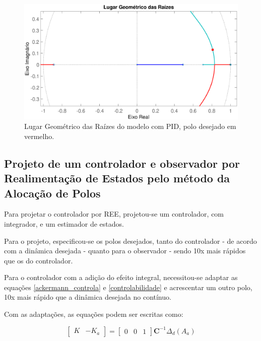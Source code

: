 \documentclass[conference,harvard,brazil,english]{sbatex}
\begin{document}
            \begin{figure}[!htb] 
                \centering \includegraphics[width=\columnwidth]{imagens/lgrPID.eps}{
                    \small
                    \centering
                    \caption{Lugar Geométrico das Raízes do modelo com PID, polo desejado em vermelho.}
                    \label{LGRPID}}    
            \end{figure}
            
        \subsection{Projeto de um controlador e observador por Realimentação de Estados pelo método da Alocação de Polos}
        
            Para projetar o controlador por REE, projetou-se um controlador, com integrador, e um estimador de estados.
                
            Para o projeto, especificou-se os polos desejados, tanto do controlador - de acordo com a dinâmica desejada - quanto para o observador - sendo 10x mais rápidos que os do controlador.
            
            Para o controlador com a adição do efeito integral, necessitou-se adaptar as equações \ref{ackermann_controla} e \ref{controlabilidade} e acrescentar um outro polo, 10x mais rápido que a dinâmica desejada no contínuo.
            
            Com as adaptações, as equações podem ser escritas como:
            
            \begin{equation}
                \begin{bmatrix}K & -K_a\end{bmatrix}= \begin{bmatrix}
                    0 & 0 & 1
                \end{bmatrix}
                \textbf{C}^{-1}\Delta_d(A_a)
                \label{aumentada}
           \end{equation}
           
\end{document}
